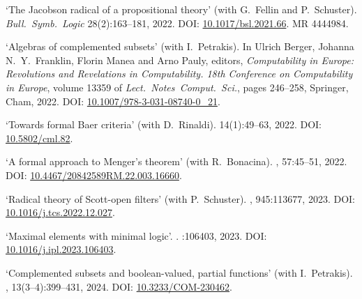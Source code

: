 \documentclass[a4paper]{article}
\begin{document}
\begin{flushleft}
\begin{thebibliography}{10}
\newblock `The {J}acobson radical of a propositional theory' (with G.~Fellin and P.~Schuster).
\newblock \emph{Bull.~Symb.~Logic} 28(2):163--181, 2022.
\newblock DOI: \href{https://doi.org/10.1017/bsl.2021.66}{10.1017/bsl.2021.66}.
\newblock MR 4444984.

\newblock `Algebras of complemented subsets' (with I.~Petrakis).
\newblock  In Ulrich Berger, Johanna N.~Y.~Franklin, Florin Manea and Arno Pauly, editors, {\em Computability in Europe: Revolutions and Revelations in Computability. 18th Conference on Computability in Europe},
\newblock volume 13359 of {\em Lect.~Notes~Comput.~Sci.}, pages 246--258, Springer, Cham, 2022.
\newblock DOI: \href{https://doi.org/10.1007/978-3-031-08740-0_21}{10.1007/978-3-031-08740-0\_21}.

\newblock `Towards formal Baer criteria' (with D.~Rinaldi).
 14(1):49--63, 2022.
\newblock DOI: \href{https://doi.org/10.5802/cml.82}{10.5802/cml.82}.

\newblock `A formal approach to Menger's theorem' (with R.~Bonacina).
, 57:45--51, 2022.
\newblock DOI: \href{https://doi.org/10.4467/20842589RM.22.003.16660}{10.4467/20842589RM.22.003.16660}.

\newblock `Radical theory of Scott-open filters' (with P.~Schuster).
, 945:113677, 2023.
\newblock DOI: \href{https://doi.org/10.1016/j.tcs.2022.12.027}{10.1016/j.tcs.2022.12.027}.

\newblock `Maximal elements with minimal logic'.
.
:106403, 2023.
\newblock DOI: \href{https://doi.org/10.1016/j.ipl.2023.106403}{10.1016/j.ipl.2023.106403}.

\newblock `Complemented subsets and boolean-valued, partial functions' (with I.~Petrakis).
, 13(3--4):399--431, 2024.
\newblock DOI: \href{}{10.3233/COM-230462}.


\end{thebibliography}


\end{flushleft}
\end{document}
